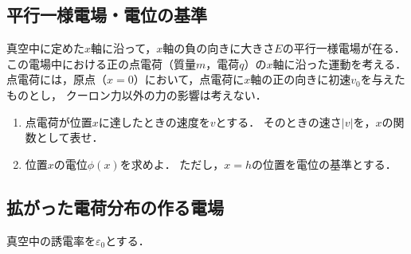 \documentclass[fleqn,head_space=14mm,foot_space=15mm,gutter=10mm,fore_edge=10mm,
    twocolumn,jafontscale=0.92]{jlreq}
\begin{document}
\subsection{平行一様電場・電位の基準}

真空中に定めた$x$軸に沿って，$x$軸の負の向きに大きさ$E$の平行一様電場が在る．
この電場中における正の点電荷（質量$m$，電荷$q$）の$x$軸に沿った運動を考える．
点電荷には，原点（$x=0$）において，点電荷に$x$軸の正の向きに初速$v_0$を与えたものとし，
クーロン力以外の力の影響は考えない．

\begin{enumerate}

    \item 点電荷が位置$x$に達したときの速度を$v$とする．
    そのときの速さ$|v|$を，$x$の関数として表せ．

    \item 位置$x$の電位$\phi(x)$を求めよ．
    ただし，$x=h$の位置を電位の基準とする．

\end{enumerate}

\vspace{2cm}
\vfill

\subsection{拡がった電荷分布の作る電場}

真空中の誘電率を$\varepsilon_0$とする．
\end{document}
